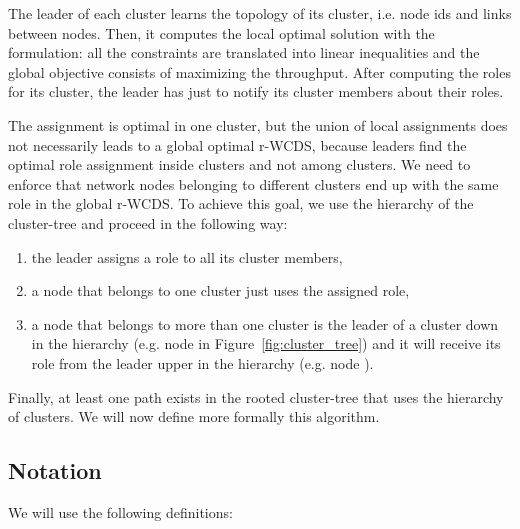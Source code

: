 \documentclass[twoside]{article}
\begin{document}
The leader of each cluster learns the topology of its cluster,
i.e. node ids and links between nodes. Then, it computes the local
optimal solution with the \milp formulation: all the constraints are
translated into linear inequalities and the global objective consists of
maximizing the throughput. After computing the roles for its cluster,
the leader has just to notify its cluster members about their
roles. 


The assignment is optimal in one cluster, but the union of local
assignments does not necessarily leads to a global optimal r-WCDS, because
leaders find the optimal role assignment inside clusters and not among
clusters. 
We need to enforce that network nodes belonging to different clusters
end up with the same role in the global r-WCDS. To achieve this goal,
we use the hierarchy of the cluster-tree and proceed in the following
way:
\begin{enumerate}
	\item the leader assigns a role to all its cluster members,
	\item a node that belongs to one cluster just uses the
          assigned role,
	\item a node that belongs to more than one cluster is the
          leader of a cluster down in the hierarchy (e.g. node  in
          Figure~\ref{fig:cluster_tree}) and it will receive its role
          from the leader upper in the hierarchy (e.g. node ).
\end{enumerate}

Finally, at least one path exists in the rooted cluster-tree that uses the hierarchy of clusters. We will now define more formally this algorithm. 

\subsection{Notation}
We will use the following definitions:
\end{document}
